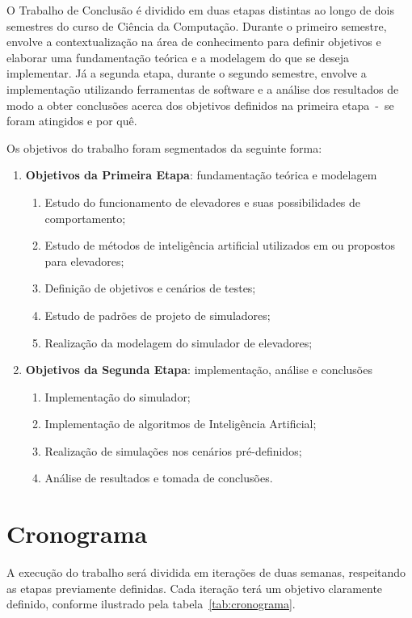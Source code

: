 O Trabalho de Conclusão é dividido em duas etapas distintas ao longo de dois
semestres do curso de Ciência da Computação. Durante o primeiro semestre,
envolve a contextualização na área de conhecimento para definir objetivos e
elaborar uma fundamentação teórica e a modelagem do que se deseja implementar.
Já a segunda etapa, durante o segundo semestre, envolve a implementação
utilizando ferramentas de software e a análise dos resultados de modo a obter
conclusões acerca dos objetivos definidos na primeira etapa~-~se foram atingidos
e por quê.

Os objetivos do trabalho foram segmentados da seguinte forma:

\begin{enumerate}
  \item \textbf{Objetivos da Primeira Etapa}: fundamentação teórica e modelagem
  \begin{enumerate}[label*=\arabic*.]
    \item Estudo do funcionamento de elevadores e suas possibilidades de
          comportamento;
    \item Estudo de métodos de inteligência artificial utilizados em ou
          propostos para elevadores;
    \item Definição de objetivos e cenários de testes;
    \item Estudo de padrões de projeto de simuladores;
    \item Realização da modelagem do simulador de elevadores;
  \end{enumerate}
  \item \textbf{Objetivos da Segunda Etapa}: implementação, análise e conclusões
  \begin{enumerate}[label*=\arabic*.]
    \item Implementação do simulador;
    \item Implementação de algoritmos de Inteligência Artificial;
    \item Realização de simulações nos cenários pré-definidos;
    \item Análise de resultados e tomada de conclusões.
  \end{enumerate}
\end{enumerate}

\section{\label{section:schedule}Cronograma}

A execução do trabalho será dividida em iterações de duas semanas, respeitando
as etapas previamente definidas. Cada iteração terá um objetivo claramente
definido, conforme ilustrado pela tabela~\ref{tab:cronograma}.

